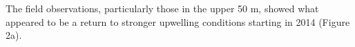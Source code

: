 \documentclass[draft]{agujournal2019}
\begin{document}
        The field observations, particularly those in the upper 50 m, showed what appeared to be a return to stronger upwelling conditions starting in 2014 (Figure 2a).


\end{document}
